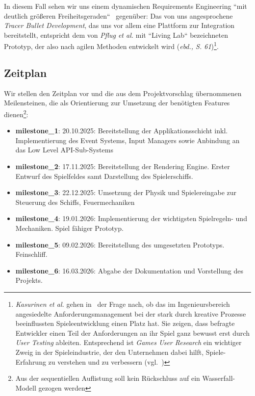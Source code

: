 In diesem Fall sehen wir uns einem dynamischen Requirements Engineering ``mit deutlich größeren Freiheitsgeraden``~\cite[60]{MRP21} gegenüber: Das von uns angesprochene \textit{Tracer Bullet Development}, das uns vor allem eine Plattform zur Integration bereitstellt, entspricht dem von \textit{Pflug et al.} mit ``Living Lab`` bezeichneten Prototyp, der also nach agilen Methoden entwickelt wird (\textit{ebd., S. 61})\footnote{
    \textit{Kasurinen et al.} gehen in~\cite[]{KMS14} der Frage nach, ob das im Ingenieursbereich angesiedelte Anforderungsmanagement bei der stark durch kreative Prozesse beeinflussten Spieleentwicklung einen Platz hat. Sie zeigen, dass befragte Entwickler einen Teil der Anforderungen an ihr Spiel ganz bewusst erst durch \textit{User Testing} ableiten. Entsprechend ist \textit{Games User Research} ein wichtiger Zweig in der Spieleindustrie, der den Unternehmen dabei hilft, Spiele-Erfahrung zu verstehen und zu verbessern (vgl.~\cite[26]{Zam18})
}.\\

\subsection{Zeitplan}

Wir stellen den Zeitplan vor und die aus dem Projektvorschlag übernommenen Meilensteinen, die als Orientierung zur Umsetzung der benötigten Features dienen\footnote{Aus der sequentiellen Auflistung soll kein Rückschluss auf ein Wasserfall-Modell gezogen werden}:

\vspace{2mm}
\begin{itemize}
    \itemsep0.5em
    \item \textbf{milestone\_1}: 20.10.2025: Bereitstellung der Applikationsschicht inkl. Implementierung des Event
    Systems, Input Managers sowie Anbindung an das Low Level API-Sub-Systems
    \item \textbf{milestone\_2}: 17.11.2025: Bereitstellung der Rendering Engine. Erster Entwurf des Spielfeldes
    samt Darstellung des Spielerschiffs.
    \item \textbf{milestone\_3}: 22.12.2025: Umsetzung der Physik und Spielereingabe zur Steuerung des Schiffs,
    Feuermechaniken
    \item \textbf{milestone\_4}: 19.01.2026: Implementierung der wichtigsten Spielregeln- und Mechaniken. Spiel
    fähiger Prototyp.
    \item \textbf{milestone\_5}: 09.02.2026: Bereitstellung des umgesetzten Prototyps. Feinschliff.
    \item \textbf{milestone\_6}: 16.03.2026: Abgabe der Dokumentation und Vorstellung des Projekts.
\end{itemize}
\vspace{2mm}

